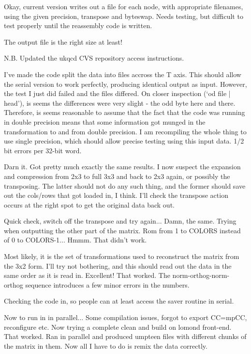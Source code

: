 \documentclass[12pt]{article}
\begin{document}
Okay, current version writes out a file for each node, with appropriate
filenames, using the given precision, transpose and byteswap.  Needs testing,
but difficult to test properly until the reassembly code is written.

The output file is the right size at least!  

N.B. Updated the ukqcd CVS repository access instructions.

I've made the code split the data into files accross the T axis.  This should
allow the serial version to work perfectly, producing identical output as
input.  However, the test I just did failed and the files differed.  On closer
inspection (`od file | head'), is seems the differences were very slight - the
odd byte here and there.  Therefore, is seems reasonable to assume that the
fact that the code was running in double precision means that some information
got munged in the transformation to and from double precision.  I am
recompiling the whole thing to use single precision, which should allow
precise testing using this input data.  1/2 bit errors per 32-bit word.

Darn it.  Got pretty much exactly the same results.  I now suspect the
expansion and compression from 2x3 to full 3x3 and back to 2x3 again, or
possibly the transposing.  The latter should not do any such thing, and the
former should save out the cols/rows that got loaded in, I think.  I'll check
the transpose action occurs at the right spot to get the original data back
out.

Quick check, switch off the transpose and try again...  Damn, the same.
Trying when outputting the other part of the matrix. Rom from 1 to COLORS
instead of 0 to COLORS-1...  Hmmm.  That didn't work. 

Most likely, it is the set of transformations used to reconstruct the matrix
from the 3x2 form.  I'll try not bothering, and this should read out the data
in the same order as it is read in.  Excellent!  That worked.  The
norm-orthog-norm-orthog sequence introduces a few minor errors in the numbers.

Checking the code in, so people can at least access the saver routine in
serial.

Now to run in in parallel...  Some compilation issues, forgot to export
CC=mpCC, reconfigure etc. Now trying a complete clean and build on lomond
front-end.  That worked.  Ran in parallel and produced umpteen files with
different chunks of the matrix in them.  Now all I have to do is remix the
data correctly.
\end{document}
